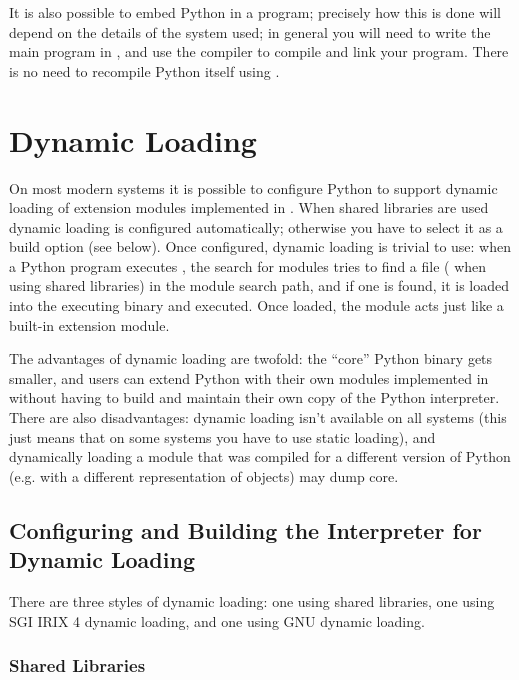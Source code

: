 \documentclass{manual}
\begin{document}
It is also possible to embed Python in a \Cpp{} program; precisely how this
is done will depend on the details of the \Cpp{} system used; in general you
will need to write the main program in \Cpp{}, and use the \Cpp{} compiler
to compile and link your program.  There is no need to recompile Python
itself using \Cpp{}.


\chapter{Dynamic Loading}
\label{dynload}

On most modern systems it is possible to configure Python to support
dynamic loading of extension modules implemented in \C{}.  When shared
libraries are used dynamic loading is configured automatically;
otherwise you have to select it as a build option (see below).  Once
configured, dynamic loading is trivial to use: when a Python program
executes , the search for modules tries to find a
file  ( when using shared
libraries) in the module search path,%
and if one is found, it is loaded into the executing binary and
executed.  Once loaded, the module acts just like a built-in extension
module.

The advantages of dynamic loading are twofold: the ``core'' Python
binary gets smaller, and users can extend Python with their own
modules implemented in \C{} without having to build and maintain their
own copy of the Python interpreter.  There are also disadvantages:
dynamic loading isn't available on all systems (this just means that
on some systems you have to use static loading), and dynamically
loading a module that was compiled for a different version of Python
(e.g. with a different representation of objects) may dump core.


\section{Configuring and Building the Interpreter for Dynamic Loading}
\label{dynloadConfig}

There are three styles of dynamic loading: one using shared libraries,
one using SGI IRIX 4 dynamic loading, and one using GNU dynamic
loading.

\subsection{Shared Libraries}
\label{sharedlibs}
\end{document}
